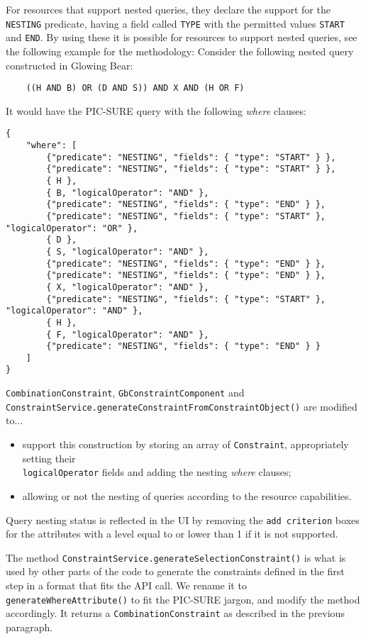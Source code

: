 For resources that support nested queries, they declare the support for the \verb|NESTING| predicate, having a field called \verb|TYPE| with the permitted values \verb|START| and \verb|END|.
By using these it is possible for resources to support nested queries, see the following example for the methodology:
Consider the following nested query constructed in Glowing Bear:
\begin{verbatim}
    ((H AND B) OR (D AND S)) AND X AND (H OR F)
\end{verbatim}
It would have the PIC-SURE query with the following \emph{where} clauses:
\begin{verbatim}
{
    "where": [
        {"predicate": "NESTING", "fields": { "type": "START" } },
        {"predicate": "NESTING", "fields": { "type": "START" } },
        { H },
        { B, "logicalOperator": "AND" },
        {"predicate": "NESTING", "fields": { "type": "END" } },
        {"predicate": "NESTING", "fields": { "type": "START" }, "logicalOperator": "OR" },
        { D },
        { S, "logicalOperator": "AND" },
        {"predicate": "NESTING", "fields": { "type": "END" } },
        {"predicate": "NESTING", "fields": { "type": "END" } },
        { X, "logicalOperator": "AND" },
        {"predicate": "NESTING", "fields": { "type": "START" }, "logicalOperator": "AND" },
        { H },
        { F, "logicalOperator": "AND" },
        {"predicate": "NESTING", "fields": { "type": "END" } }
    ]
}
\end{verbatim}

\verb|CombinationConstraint|, \verb|GbConstraintComponent| and \\
\verb|ConstraintService.generateConstraintFromConstraintObject()| are modified to...
\begin{itemize}
    \item support this construction by storing an array of \verb|Constraint|, appropriately setting their \\
    \verb|logicalOperator| fields and adding the nesting \emph{where} clauses;
    \item allowing or not the nesting of queries according to the resource capabilities.
\end{itemize}
Query nesting status is reflected in the UI by removing the \verb|add criterion| boxes for the attributes with a level equal to or lower than 1 if it is not supported.

The method \verb|ConstraintService.generateSelectionConstraint()| is what is used by other parts of the code to generate the constraints defined in the first step in a format that fits the API call.
We rename it to \verb|generateWhereAttribute()| to fit the PIC-SURE jargon, and modify the method accordingly.
It returns a \verb|CombinationConstraint| as described in the previous paragraph.

